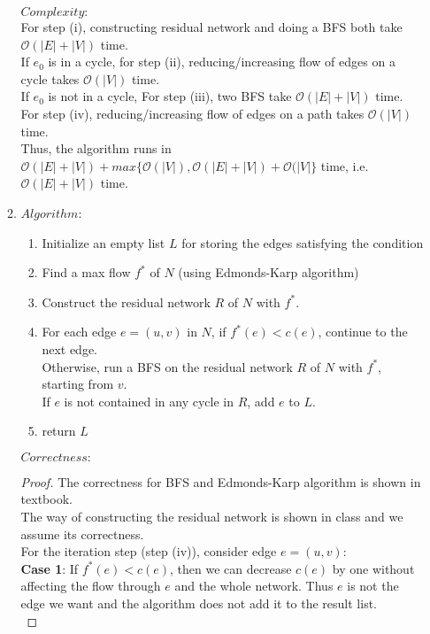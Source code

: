 \documentclass[11pt]{article}
\begin{document}
\begin{enumerate}
\begin{enumerate}
    $Complexity: $\\
    For step (i), constructing residual network and doing a BFS both take $\mathcal{O}(|E| + |V|)$ time.\\
    If $e_0$ is in a cycle, for step (ii), reducing/increasing flow of edges on a cycle takes $\mathcal{O}(|V|)$ time.\\
    If $e_0$ is not in a cycle, For step (iii), two BFS take $\mathcal{O}(|E| + |V|)$ time. For step (iv), reducing/increasing flow of edges on a path takes $\mathcal{O}(|V|)$ time.\\
    Thus, the algorithm runs in $\mathcal{O}(|E| + |V|) + max\{ \mathcal{O}(|V|), \mathcal{O}(|E| + |V|)  + \mathcal{O}(|V|\}$ time, i.e. $\mathcal{O}(|E| + |V|)$ time.\\[2ex]
    
    \item $Algorithm$:\\
    \begin{enumerate}
        \item Initialize an empty list $L$ for storing the edges satisfying the condition
        \item Find a max flow $f^*$ of $N$ (using Edmonds-Karp algorithm)
        \item Construct the residual network $R$ of $N$ with $f^*$.
        \item For each edge $e = (u, v)$ in $N$, if $f^*(e) < c(e)$, continue to the next edge.\\
        Otherwise, run a BFS on the residual network $R$ of $N$ with $f^*$, starting from $v$.\\
        If $e$ is not contained in any cycle in $R$, add $e$ to $L$. 
        \item return $L$\\[2ex]
    \end{enumerate}
    $Correctness: $
    \begin{proof}
        The correctness for BFS and Edmonds-Karp algorithm is shown in textbook.\\
        The way of constructing the residual network is shown in class and we assume its correctness.\\
        For the iteration step (step (iv)), consider edge $e = (u, v)$:\\
        \textbf{Case 1}: If $f^*(e) < c(e)$, then we can decrease $c(e)$ by one without affecting the flow through $e$ and the whole network. Thus $e$ is not the edge we want and the algorithm does not add it to the result list.\\

\end{proof}
\end{enumerate}
\end{enumerate}
\end{document}
